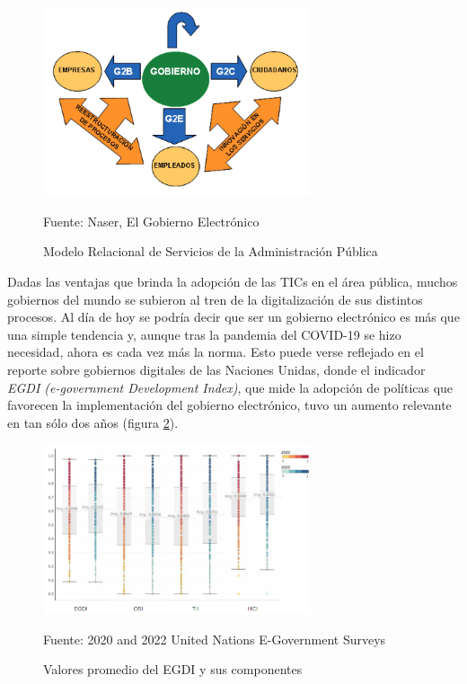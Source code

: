 \begin{figure}[!htpb]
    \centering
    \includegraphics[width=0.7\textwidth]{assets/g2all}
    \caption{Modelo Relacional de Servicios de la Administración Pública}{Fuente: Naser, El Gobierno Electrónico}
    \label{fig:g2all}
\end{figure}

Dadas las ventajas que brinda la adopción de las TICs en el área pública, muchos gobiernos del mundo se subieron al tren de la digitalización de sus distintos procesos. 
Al día de hoy se podría decir que ser un gobierno electrónico es más que una simple tendencia y, aunque tras la pandemia del COVID-19 se hizo necesidad, ahora es cada vez más la norma. 
Esto puede verse reflejado en el reporte sobre gobiernos digitales de las Naciones Unidas, 
donde el indicador \textit{EGDI (e-government Development Index)}, que mide la adopción de políticas que favorecen la implementación del gobierno electrónico, 
tuvo un aumento relevante en tan sólo dos años (figura \ref{fig:egdi2020_2022}).

\begin{figure}[!htpb]
    \centering
    \includegraphics[width=0.7\textwidth]{assets/egdi2020_2022}
    \caption{Valores promedio del EGDI y sus componentes}{Fuente: 2020 and 2022
        United Nations E-Government Surveys}
    \label{fig:egdi2020_2022}
\end{figure}

